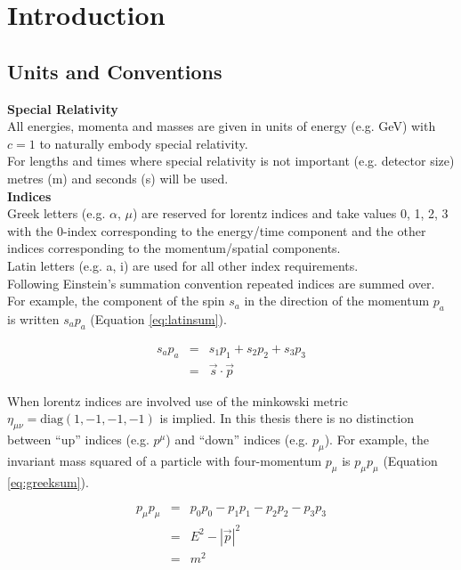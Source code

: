 \chapter{Introduction}

\section{Units and Conventions}

{\bf Special Relativity} \\

All energies, momenta and masses are given in units of energy (e.g. GeV) with
$c=1$ to naturally embody special relativity. \\

For lengths and times where special relativity is not important (e.g. detector
size) metres (m) and seconds (s) will be used. \\

{\bf Indices} \\

Greek letters (e.g. $\alpha$, $\mu$) are reserved for lorentz indices and take
values 0, 1, 2, 3 with the 0-index corresponding to the energy/time component
and the other indices corresponding to the momentum/spatial components. \\

Latin letters (e.g. a, i) are used for all other index requirements. \\

Following Einstein's summation convention repeated indices are summed over. For 
example, the component of the spin $s_{a}$ in the direction of the momentum 
$p_{a}$ is written $s_{a}p_{a}$ (Equation \ref{eq:latinsum}).

\begin{eqnarray}
s_{a}p_{a} &=& s_{1}p_{1} + s_{2}p_{2} + s_{3}p_{3} \nonumber \\
&=& \vec{s}\cdot\vec{p}
\label{eq:latinsum}
\end{eqnarray}

When lorentz indices are involved use of the minkowski metric $\eta_{\mu\nu} =
\mathrm{diag}(1, -1, -1, -1)$ is implied. In this thesis there is no distinction 
between ``up'' indices (e.g. $p^{\mu}$) and ``down'' indices (e.g. $p_{\mu}$). 
For example, the invariant mass squared of a particle with four-momentum 
$p_{\mu}$ is $p_{\mu}p_{\mu}$ (Equation \ref{eq:greeksum}). 

\begin{eqnarray}
p_{\mu}p_{\mu} &=& p_{0}p_{0} - p_{1}p_{1} - p_{2}p_{2} - p_{3}p_{3} \nonumber
\\
&=& E^{2} - |\vec{p}|^{2} \nonumber \\
&=& m^{2}
\label{eq:greeksum}
\end{eqnarray}

